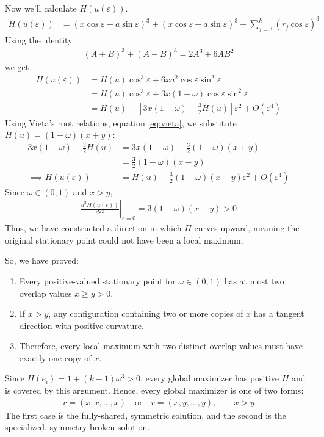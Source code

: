 \documentclass[11pt, reqno]{amsart}
\theoremstyle{notestyle}
\theoremstyle{defstyle}
\begin{document}
Now we'll calculate $H(u(\varepsilon))$.
\begin{align*}
    H(u(\varepsilon))
    &= (x\cos\varepsilon + a\sin\varepsilon)^3
    + (x\cos\varepsilon - a\sin\varepsilon)^3
    + \sum_{j=3}^k (r_j \cos\varepsilon)^3
\end{align*}
Using the identity
\begin{align*}
    (A+B)^3 + (A-B)^3
    = 2A^3 + 6AB^2
\end{align*}
we get
\begin{align*}
    H(u(\varepsilon))
    &= H(u) \cos^3\varepsilon
    + 6xa^2 \cos\varepsilon \sin^2\varepsilon \\
    &= H(u) \cos^3\varepsilon
    + 3x(1-\omega) \cos\varepsilon \sin^2\varepsilon \\
    &= H(u)
    + \left[3x(1-\omega) - \frac{3}{2} H(u) \right]\varepsilon^2 + O(\varepsilon^4)
\end{align*}
Using Vieta's root relations, equation \ref{eq:vieta}, we substitute $H(u) = (1-\omega)(x+y)$:
\begin{align*}
    3x(1-\omega) - \frac{3}{2} H(u)
    &= 3x(1-\omega)
    - \frac{3}{2}(1-\omega)(x+y) \\
    &= \frac{3}{2} (1-\omega)(x-y) \\
    \implies
    H(u(\varepsilon))
    &= H(u) + \frac{3}{2}(1-\omega)(x-y)\varepsilon^2 + O(\varepsilon^4)
\end{align*}
Since $\omega \in (0, 1)$ and $x > y$,
\begin{align*}
    \left. \frac{d^2 H(u(\varepsilon))}{d\varepsilon^2} \right|_{\varepsilon=0}
    = 3(1-\omega)(x-y) > 0
\end{align*}
Thus, we have constructed a direction in which $H$ curves upward, meaning the original stationary point could not have been a local maximum.

So, we have proved:
\begin{enumerate}
    \item Every positive-valued stationary point for $\omega \in (0, 1)$ has at most two overlap values $x \geq y > 0$.
    \item If $x > y$, any configuration containing two or more copies of $x$ has a tangent direction with positive curvature.
    \item Therefore, every local maximum with two distinct overlap values must have exactly one copy of $x$.
\end{enumerate}
Since $H(e_i)=1+(k-1)\omega^3>0$, every global maximizer has positive $H$ and is covered by this argument.
Hence, every global maximizer is one of two forms:
\begin{align*}
    r = (x, x, \dots, x)
    \quad \text{or} \quad
    r = (x, y, \dots, y),
    \qquad x > y
\end{align*}
The first case is the fully-shared, symmetric solution, and the second is the specialized, symmetry-broken solution.
\end{document}
